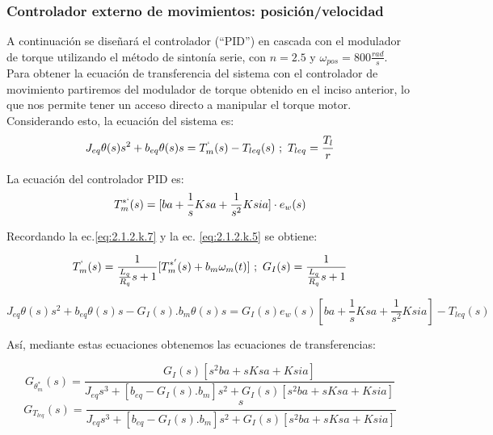 \documentclass[10pt]{article}
\begin{document}
\subsubsection{Controlador externo de movimientos: posición/velocidad }
A continuación se diseñará el controlador (``PID'') en cascada con el modulador de torque utilizando el método de sintonía serie, con $n=2.5$ y $\omega_{pos}=800\frac{rad}{s}$.
Para obtener la ecuación de transferencia del sistema con el controlador de movimiento partiremos del modulador de torque obtenido en el inciso anterior, lo que nos permite tener un acceso directo a manipular el torque motor.
Considerando esto, la ecuación del sistema es:
		\begin{equation}
	J_{eq}\theta(s)s^{2}+b_{eq}\theta(s)s=T^{`}_{m}(s)-T_{leq}(s) \ ; \ T_{leq}= \frac{T_{l}}{r}
	\label{eq:2.1.2.q.1}
	\end{equation}
	
La ecuación del controlador PID es:
		\begin{equation}
	T^{*`}_{m}(s)=[ba+\frac{1}{s}Ksa + \frac{1}{s^{2}}Ksia]\cdot e_{w}(s)
	\label{eq:2.1.2.q.2}
	\end{equation}
	
Recordando la ec.\ref{eq:2.1.2.k.7} y la ec. \ref{eq:2.1.2.k.5} se obtiene:

	\begin{equation}
	T^{`}_{m}(s)=\frac{1}{\frac{L_{q}}{R_{q}}s+1}[T^{*'}_{m}(s)+b_{m}\omega_{m}(t)] \ ; \ G_{I}(s)=\frac{1}{\frac{L_{q}}{R_{q}}s+1}
	\label{eq:2.1.2.q.4}
	\end{equation}

	\begin{equation}
	J_{eq}\theta(s)s^{2}+b_{eq}\theta(s)s-G_{I}(s).b_{m}\theta(s)s=G_{I}(s)e_{w}(s)[ba+\frac{1}{s}Ksa + \frac{1}{s^{2}}Ksia]-T_{leq}(s)
	\label{eq:2.1.2.q.5}
	\end{equation}
	
Así, mediante estas ecuaciones obtenemos las ecuaciones de transferencias:
 
	\begin{equation}
	G_{\theta^{*}_{m}}(s)=\frac{G_{I}(s)[s^{2}ba+sKsa+Ksia]}{J_{eq}s^{3}+[b_{eq}-G_{I}(s).b_{m}]s^{2}+G_{I}(s)[s^{2}ba+sKsa+Ksia]}
	\label{eq:2.1.2.q.6}
	\end{equation}
 	\begin{equation}
	G_{T_{leq}}(s)=\frac{s}{J_{eq}s^{3}+[b_{eq}-G_{I}(s).b_{m}]s^{2}+G_{I}(s)[s^{2}ba+sKsa+Ksia]}
	\label{eq:2.1.2.q.6}
	\end{equation}
	
\end{document}
